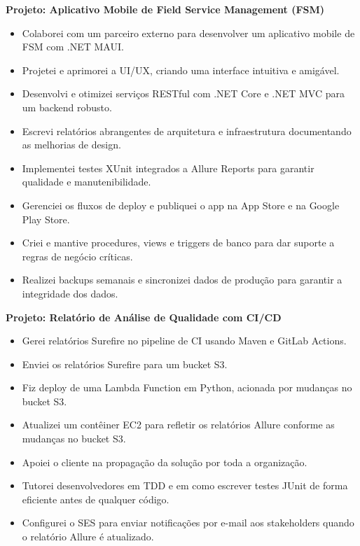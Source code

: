 \documentclass[10pt,a4paper]{altacv}
\begin{document}
\textbf{Projeto: Aplicativo Mobile de Field Service Management (FSM)}
\begin{itemize}
    \setlength{\itemindent}{0.5em}
    \item[--] Colaborei com um parceiro externo para desenvolver um aplicativo mobile de FSM com .NET MAUI.
    \item[--] Projetei e aprimorei a UI/UX, criando uma interface intuitiva e amigável.
    \item[--] Desenvolvi e otimizei serviços RESTful com .NET Core e .NET MVC para um backend robusto.
    \item[--] Escrevi relatórios abrangentes de arquitetura e infraestrutura documentando as melhorias de design.
    \item[--] Implementei testes XUnit integrados a Allure Reports para garantir qualidade e manutenibilidade.
    \item[--] Gerenciei os fluxos de deploy e publiquei o app na App Store e na Google Play Store.
    \item[--] Criei e mantive procedures, views e triggers de banco para dar suporte a regras de negócio críticas.
    \item[--] Realizei backups semanais e sincronizei dados de produção para garantir a integridade dos dados.
\end{itemize}



\textbf{Projeto: Relatório de Análise de Qualidade com CI/CD}
\begin{itemize}
    \setlength{\itemindent}{0.5em}
    \item[--] Gerei relatórios Surefire no pipeline de CI usando Maven e GitLab Actions.
    \item[--] Enviei os relatórios Surefire para um bucket S3.
    \item[--] Fiz deploy de uma Lambda Function em Python, acionada por mudanças no bucket S3.
    \item[--] Atualizei um contêiner EC2 para refletir os relatórios Allure conforme as mudanças no bucket S3.
    \item[--] Apoiei o cliente na propagação da solução por toda a organização.
    \item[--] Tutorei desenvolvedores em TDD e em como escrever testes JUnit de forma eficiente antes de qualquer código.
    \item[--] Configurei o SES para enviar notificações por e-mail aos stakeholders quando o relatório Allure é atualizado.
\end{itemize}
\end{document}
